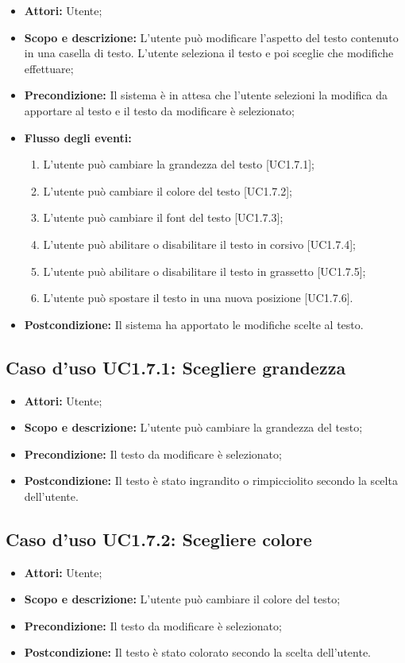 \begin{itemize}
	\item \textbf{Attori:} Utente;
	\item \textbf{Scopo e descrizione:} L'utente può modificare l'aspetto del testo contenuto in una casella di testo. L'utente seleziona il testo e poi sceglie che modifiche effettuare;
	\item \textbf{Precondizione:} Il sistema è in attesa che l'utente selezioni la modifica da apportare al testo e il testo da modificare è selezionato;
	\item \textbf{Flusso degli eventi:}
	\begin{enumerate}
		\item L'utente può cambiare la grandezza del testo [UC1.7.1];
		\item L'utente può cambiare il colore del testo [UC1.7.2];
		\item L'utente può cambiare il font del testo [UC1.7.3];
		\item L'utente può abilitare o disabilitare il testo in corsivo [UC1.7.4];
		\item L'utente può abilitare o disabilitare il testo in grassetto [UC1.7.5];
		\item L'utente può spostare il testo in una nuova posizione [UC1.7.6].
	\end{enumerate}
	\item \textbf{Postcondizione:} Il sistema ha apportato le modifiche scelte al testo.
\end{itemize}

\subsection{Caso d'uso UC1.7.1: Scegliere grandezza}
\begin{itemize}
	\item \textbf{Attori:} Utente;
	\item \textbf{Scopo e descrizione:} L'utente può cambiare la grandezza del testo;
	\item \textbf{Precondizione:} Il testo da modificare è selezionato;
	\item \textbf{Postcondizione:} Il testo è stato ingrandito o rimpicciolito secondo la scelta dell'utente.
\end{itemize}

\subsection{Caso d'uso UC1.7.2: Scegliere colore}
\begin{itemize}
	\item \textbf{Attori:} Utente;
	\item \textbf{Scopo e descrizione:} L'utente può cambiare il colore del testo;
	\item \textbf{Precondizione:} Il testo da modificare è selezionato;
	\item \textbf{Postcondizione:} Il testo è stato colorato secondo la scelta dell'utente.
\end{itemize}

